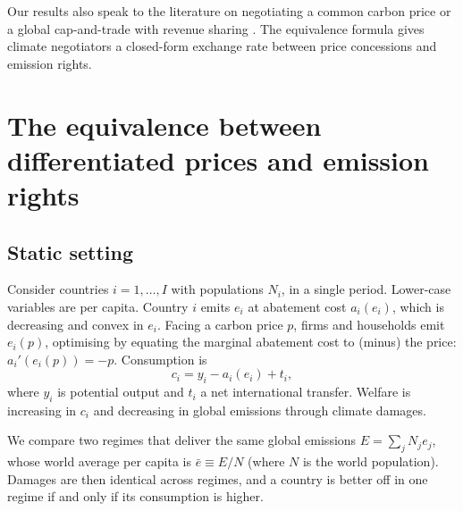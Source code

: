 \documentclass[12pt,english]{article}
\theoremstyle{remark}
\begin{document}
Our results also speak to the literature on negotiating a common carbon price or a global cap-and-trade with revenue sharing \citep{grubb_greenhouse_1990,weitzman_can_2014,gollier_negotiating_2015,cramton_global_2017,nordhaus_climate_2015,fabre_global_2024}. The equivalence formula gives climate negotiators a closed-form exchange rate between price concessions and emission rights.

\section{The equivalence between differentiated prices and emission rights}
\label{sec:theory}

\subsection{Static setting}

Consider countries $i=1,\dots,I$ with populations $N_i$, %
in a single period. Lower-case variables are per capita. Country $i$ emits $e_i$ at abatement cost $a_i(e_i)$, which is decreasing and convex in $e_i$. Facing a carbon price $p$, firms and households emit $e_i(p)$, optimising by equating the marginal abatement cost to (minus) the price: $a_i'(e_i(p)) = -p$. Consumption is
\begin{equation}
  c_i = y_i - a_i(e_i) + t_i,
\end{equation}
where $y_i$ is potential output and $t_i$ a net international transfer. Welfare is increasing in $c_i$ and decreasing in global emissions through climate damages. 

We compare two regimes that deliver the same global emissions $E=\sum_j N_j e_j$, whose world average per capita is $\bar e\equiv E/N$ (where $N$ is the world population).
Damages are then identical across regimes, and a country is better off in one regime if and only if its consumption is higher.
\end{document}
